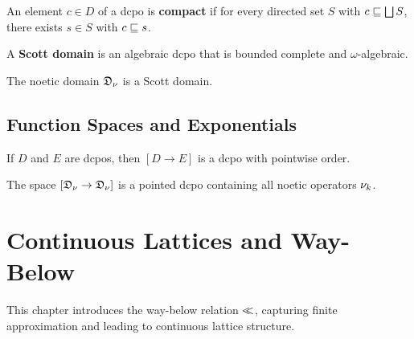 \begin{definition}
\label{def:compact-element}
An element $c \in D$ of a dcpo is \textbf{compact} if for every directed set $S$
with $c \sqsubseteq \bigsqcup S$, there exists $s \in S$ with $c \sqsubseteq s$.
\end{definition}

\begin{definition}
\label{def:scott-domain}
A \textbf{Scott domain} is an algebraic dcpo that is bounded complete and
$\omega$-algebraic.
\end{definition}

\begin{theorem}
\label{thm:noetic-scott-domain}
The noetic domain $\mathfrak{D}_\nu$ is a Scott domain.
\end{theorem}

\section{Function Spaces and Exponentials}

\begin{theorem}
\label{thm:function-space-dcpo}
If $D$ and $E$ are dcpos, then $[D \to E]$ is a dcpo with pointwise order.
\end{theorem}

\begin{corollary}
\label{cor:noetic-function-domain}
The space $[\mathfrak{D}_\nu \to \mathfrak{D}_\nu]$ is a pointed dcpo containing
all noetic operators $\nu_{k}$.
\end{corollary}


\chapter{Continuous Lattices and Way-Below}
\label{ch:continuous-lattices}

\begin{tcolorbox}[colback=blue!5!white,colframe=blue!75!black,title=\vnewfour]
This chapter introduces the way-below relation $\ll$, capturing finite
approximation and leading to continuous lattice structure.
\end{tcolorbox}

